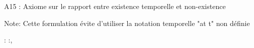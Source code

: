 \documentclass[10pt]{report}
\begin{document}
\begin{coqdoccode}
\coqdocemptyline
\coqdocnoindent
\begin{coqdoccomment}
\coqdocindent{0.50em}
A15\coqdocindent{0.50em}
:\coqdocindent{0.50em}
Axiome\coqdocindent{0.50em}
sur\coqdocindent{0.50em}
le\coqdocindent{0.50em}
rapport\coqdocindent{0.50em}
entre\coqdocindent{0.50em}
existence\coqdocindent{0.50em}
temporelle\coqdocindent{0.50em}
et\coqdocindent{0.50em}
non-existence\coqdocindent{0.50em}
\end{coqdoccomment}
\coqdoceol
\coqdocnoindent
\begin{coqdoccomment}
\coqdocindent{0.50em}
Note:\coqdocindent{0.50em}
Cette\coqdocindent{0.50em}
formulation\coqdocindent{0.50em}
évite\coqdocindent{0.50em}
d'utiliser\coqdocindent{0.50em}
la\coqdocindent{0.50em}
notation\coqdocindent{0.50em}
temporelle\coqdocindent{0.50em}
"at\coqdocindent{0.50em}
t"\coqdocindent{0.50em}
non\coqdocindent{0.50em}
définie\coqdocindent{0.50em}
\end{coqdoccomment}
\coqdoceol
\coqdocnoindent
{}  : \coqdockw{\ensuremath{\forall}} :,\coqdoceol
\coqdocindent{1.00em}

\end{coqdoccode}
\end{document}
